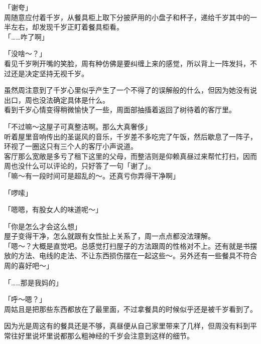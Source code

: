 「谢夸」\\

周随意应付着千岁，从餐具柜上取下分披萨用的小盘子和杯子，递给千岁其中的一半左右，却发现千岁正盯着餐具柜看。\\

「……咋了啊」

「没啥～？」\\

看见千岁咧开嘴的笑脸，周有种仿佛是要纠缠上来的感觉，所以背上一阵发抖，不过还是决定坚持无视千岁。

虽然周注意到了千岁心里似乎产生了一个不得了的误解般的什么，但因为她没有说出口，周也没法确定具体是什么。\\

看到千岁心情变得稍微愉快了一些，周面部抽搐着返回了树待着的客厅里。\\

\vspace{2\baselineskip}

「不过嘛～这屋子可真整洁啊。那么大真奢侈」\\

听着屋里音响传出的圣诞风的音乐，千岁差不多吃完了午饭，然后歇息了一阵子，环视了一圈这只有三个人的客厅小声说道。\\

客厅那么宽敞是多亏了租下这里的父母，而整洁则是仰赖真昼过来帮忙打扫，因而周也没什么可以评论的，只好答了一句「谢了」。\\

「嘛～有一段时间可是超乱的～。还真亏你弄得干净啊」

「啰嗦」

「嗯嗯，有股女人的味道呢～」

「你是怎么才会这么想」\\

屋子变得干净，怎么就跟有女性扯上关系了，周一点点都没法理解。\\

「嗯～？大概是直觉吧。总感觉打扫屋子的方法跟周的性格对不上。还有就是书摆放的方法、电线的走法、不让东西损伤摆在一起这些～。另外还有一些餐具不符合周的喜好吧～」

「……那是我妈的」

「呼～嗯？」\\

周姑且是把那些东西都放在了最里面，不过拿餐具的时候似乎还是被千岁看到了。

因为光是周这有的餐具还是不够，真昼便从自己家里带来了几样，但周没有料到平常往好里说坏里说都那么粗神经的千岁会注意到这样的细节。\\

